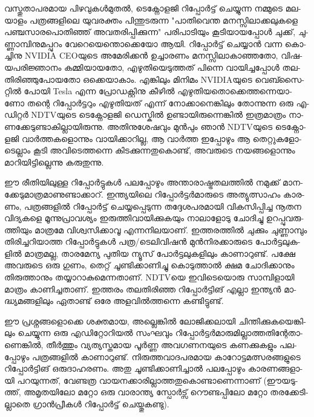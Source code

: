 ­വ­സ്തു­താ­പ­ര­മായ പി­ഴ­വു­കള്‍­മു­തല്‍, ­ടെ­ക്നോ­ള­ജി­ റി­പ്പോര്‍­ട്ട് ചെ­യ്യു­ന്ന നമ്മു­ടെ മല­യാ­ളം പത്ര­ങ്ങ­ളി­ലെ യു­വ­ര­ക്തം 
പി­ന്തു­ട­രു­ന്ന "പാ­തി­വെ­ന്ത മന­സ്സി­ലാ­ക്ക­ലു­ക­ളെ പഞ്ച­സാ­ര­പൊ­തി­ഞ്ഞ് അവ­ത­രി­പ്പി­ക്കു­ന്ന" പരി­പാ­ടി­യും കൂ­ടി­യാ­യ­പ്പോള്‍ 
ചു­ക്ക്, ചു­ണ്ണാ­മ്പി­നു­മ­പ്പു­റം വേ­റെ­യെ­ന്തൊ­ക്കെ­യോ ആയി. റി­പ്പോര്‍­ട്ട് ചെ­യ്യാന്‍ വന്ന കൊ­ച്ചി­നു NVIDIA CEO­യു­ടെ 
അമേ­രി­ക്കന്‍ ഉച്ചാ­ര­ണം മന­സ്സി­ലാ­കാ­ഞ്ഞ­തോ, വി­ഷ­യ­പ­രി­ജ്ഞാ­നം കമ്മി­യാ­യ­തോ, എഴു­തി­യെ­ടു­ത്ത­ത് പി­ന്നെ 
വാ­യി­ച്ച­പ്പോള്‍ തല­തി­രി­ഞ്ഞു­പോ­യ­തോ ഒക്കെ­യാ­കാം. എങ്കി­ലും മി­നി­മം NVIDIA­യു­ടെ വെ­ബ്സൈ­റ്റില്‍ പോ­യി Tesla 
എന്ന പ്രോ­ഡ­ക്റ്റി­നു കീ­ഴില്‍ എഴു­തി­യ­തൊ­ക്കെ­ത്ത­ന്നെ­യാ­ണോ തന്റെ റി­പ്പോര്‍­ട്ട­റും എഴു­തി­യ­ത് എന്ന് നോ­ക്കാ­നെ­ങ്കി­ലും 
തോ­ന്നു­ന്ന ഒരു എ­ഡി­റ്റര്‍ NDTV­യു­ടെ ടെ­ക്നോ­ള­ജി ഡെ­സ്കില്‍ ഉണ്ടാ­യി­രു­ന്നെ­ങ്കില്‍ ഇത്ര­മാ­ത്രം 
നാ­ണ­ക്കേ­ടു­ണ്ടാ­കി­ല്ലാ­യി­രു­ന്നു. അതി­നു­ശേ­ഷ­വും മുന്‍­പും ഞാന്‍ NDTV­യു­ടെ ടെ­ക്നോ­ള­ജി വാര്‍­ത്ത­ക­ളൊ­ന്നും വാ­യി­ക്കാ­റി­ല്ല, 
ആ ­വാര്‍­ത്ത ഇപ്പോ­ഴും ആ തെ­റ്റു­ക­ളോ­ടെ­ല്ലാം കൂ­ടി അവി­ടെ­ത്ത­ന്നെ കി­ട­ക്കു­ന്ന­തു­കൊ­ണ്ട്, അവ­രു­ടെ നയ­ങ്ങ­ളൊ­ന്നും 
മാ­റി­യി­ട്ടി­ല്ലെ­ന്നു കരു­തു­ന്നു­.

ഈ രീ­തി­യി­ലു­ള്ള റി­പ്പോര്‍­ട്ടു­കള്‍ പല­പ്പോ­ഴും അന്താ­രാ­ഷ്ട്ര­ത­ല­ത്തില്‍ നമു­ക്ക് മാ­ന­ക്കേ­ടു­മാ­ത്ര­മാ­ണു­ണ്ടാ­ക്കാ­റ്. ഇന്ത്യ­യി­ലെ 
റി­പ്പോര്‍­ട്ടര്‍­മാ­രു­ടെ അത്യു­ത്സാ­ഹം കാ­ര­ണം, പത്ര­ങ്ങ­ളില്‍ റി­പ്പോര്‍­ട്ട് ചെ­യ്യ­പ്പെ­ടു­ന്ന തദ്ദേ­ശ­പ­ര­മാ­യി വി­ക­സി­പ്പി­ച്ച നൂ­തന 
വി­ദ്യ­ക­ളെ മൂ­ന്നു­പ്രാ­വ­ശ്യം ഇരു­ത്തി­വാ­യി­ക്കു­ക­യും നാ­ലാ­ളോ­ടു ചോ­ദി­ച്ചു ഉറ­പ്പു­വ­രു­ത്തി­യും മാ­ത്ര­മേ വി­ശ്വ­സി­ക്കാ­വൂ 
എന്ന­നി­ല­യാ­ണ്. ഇത്ത­ര­ത്തില്‍ ചു­ക്കും ചു­ണ്ണാ­മ്പും തി­രി­ച്ച­റി­യാ­ത്ത റി­പ്പോര്‍­ട്ടു­കള്‍ പത്ര/­ടെ­ലി­വി­ഷന്‍ മുന്‍­നി­ര­ക്കാ­രു­ടെ 
പോര്‍­ട്ട­ലു­ക­ളില്‍ മാ­ത്ര­മ­ല്ല, താ­ര­മേ­ന്യ പു­തിയ ന്യൂ­സ് പോര്‍­ട്ട­ലു­ക­ളി­ലും കാ­ണാ­റു­ണ്ട്. പക്ഷേ അവ­രു­ടെ ഒരു ഗു­ണം, തെ­റ്റ് 
ചൂ­ണ്ടി­ക്കാ­ണി­ച്ചു കൊ­ടു­ത്താല്‍ ക്ഷമ ചോ­ദി­ക്കാ­നും തി­രു­ത്താ­നും തയ്യാ­റാ­കു­മെ­ന്ന­താ­ണ്. NDTV­യെ ഇവി­ടെ­യൊ­രു 
സാ­മ്പി­ളാ­യി മാ­ത്രം കാ­ണി­ച്ച­താ­ണ്. ഇത്ത­രം തല­തി­രി­ഞ്ഞ റി­പ്പോര്‍­ട്ടി­ങ് എല്ലാ ഇന്ത്യന്‍ മാ­ദ്ധ്യ­മ­ങ്ങ­ളി­ലും ഏതാ­ണ്ട് ഒരേ 
അള­വില്‍­ത്ത­ന്നെ കണ്ടി­ട്ടു­ണ്ട്.

ഈ പ്ര­ശ്ന­ങ്ങ­ളൊ­ക്കെ ശക്ത­മാ­യ, അല്ലെ­ങ്കില്‍ ലോ­ജി­ക്ക­ലാ­യി ചി­ന്തി­ക്കു­ക­യെ­ങ്കി­ലും ചെ­യ്യു­ന്ന ഒരു എഡി­റ്റോ­റി­യല്‍ 
സം­ഘ­വും റി­പ്പോര്‍­ട്ടര്‍­മാ­രു­മി­ല്ലാ­ത്ത­തി­ന്റേ­താ­ണെ­ങ്കില്‍, തീര്‍­ത്തും വ്യ­ത്യ­സ്ത­മായ പൂര്‍­ണ്ണ അവ­ഗ­ണ­ന­യു­ടെ കണ­ക്കു­ക­ളും 
പല­പ്പോ­ഴും പത്ര­ങ്ങ­ളില്‍ കാ­ണാ­റു­ണ്ട്. നി­രു­ത്ത­വാ­ദ­പ­ര­മായ കാ­റോ­ട്ട­മ­ത്സ­ര­ങ്ങ­ളു­ടെ റി­പ്പോര്‍­ട്ടി­ങ് ഒരു­ദാ­ഹ­ര­ണം. അതു 
ചൂ­ണ്ടി­ക്കാ­ണി­ച്ചാല്‍ പല­പ്പോ­ഴും കാ­ര­ണ­ങ്ങ­ളാ­യി പറ­യു­ന്ന­ത്, വേ­ണ്ട­ത്ര വാ­യ­ന­ക്കാ­രി­ല്ലാ­ത്ത­തു­കൊ­ണ്ടാ­ണെ­ന്നാ­ണ് 
(ഈ­യ­ടു­ത്ത്, അമൃ­ത­യി­ലോ മറ്റോ ഒരു വാ­രാ­ന്ത്യ സ്പോര്‍­ട്സ് റൌ­ണ്ട­പ്പി­ലോ മറ്റോ തര­ക്കേ­ടി­ല്ലാ­തെ ഗ്രാന്‍­പ്രീ­കള്‍ 
റി­പ്പോര്‍­ട്ട് ചെ­യ്തു­ക­ണ്ടു­).

